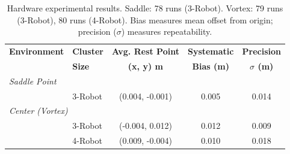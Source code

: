 \documentclass[lettersize,journal]{IEEEtran}
\begin{document}

\begin{table}[!t]
    \footnotesize
    \centering
    \caption{Hardware experimental results. Saddle: 78 runs (3-Robot). Vortex: 79 runs (3-Robot), 80 runs (4-Robot). Bias measures mean offset from origin; precision ($\sigma$) measures repeatability.}
    \label{tab:estimation_results}
    \setlength{\tabcolsep}{4pt}
    \begin{tabular}{llccc}
    \hline
    \textbf{Environment} & \textbf{Cluster} & \textbf{Avg. Rest Point} & \textbf{Systematic} & \textbf{Precision} \\
     & \textbf{Size} & \textbf{(x, y) m} & \textbf{Bias (m)} & \textbf{$\sigma$ (m)} \\
    \hline
    \multicolumn{5}{l}{\textit{Saddle Point}} \\
    \hline
     & 3-Robot & (0.004, -0.001) & 0.005 & 0.014 \\
    \hline
    \multicolumn{5}{l}{\textit{Center (Vortex)}} \\
    \hline
     & 3-Robot & (-0.004, 0.012) & 0.012 & 0.009 \\
     & 4-Robot & (0.009, -0.004) & 0.010 & 0.018 \\
    \hline
    \end{tabular}
    \end{table}
\end{document}
